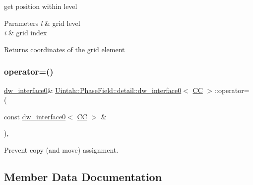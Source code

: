 get position within level 


\begin{DoxyParams}{Parameters}
{\em l} & grid level \\
\hline
{\em i} & grid index \\
\hline
\end{DoxyParams}
\begin{DoxyReturn}{Returns}
coordinates of the grid element 
\end{DoxyReturn}
\mbox{\label{classUintah_1_1PhaseField_1_1detail_1_1dw__interface0_3_01CC_01_4_a4e44be489fb9c660a8584c95b4e104b8}} 
\subsubsection{\texorpdfstring{operator=()}{operator=()}}
{\footnotesize\ttfamily \hyperlink{classUintah_1_1PhaseField_1_1detail_1_1dw__interface0}{dw\+\_\+interface0}\& \hyperlink{classUintah_1_1PhaseField_1_1detail_1_1dw__interface0}{Uintah\+::\+Phase\+Field\+::detail\+::dw\+\_\+interface0}$<$ \hyperlink{namespaceUintah_1_1PhaseField_a33d355affda78a83f45755ba8388cedda22303704507d024d1d6508ed9859a85a}{CC} $>$\+::operator= (\begin{DoxyParamCaption}\item[{const \hyperlink{classUintah_1_1PhaseField_1_1detail_1_1dw__interface0}{dw\+\_\+interface0}$<$ \hyperlink{namespaceUintah_1_1PhaseField_a33d355affda78a83f45755ba8388cedda22303704507d024d1d6508ed9859a85a}{CC} $>$ \&}]{ }\end{DoxyParamCaption})\hspace{0.3cm}{\ttfamily [protected]}, {\ttfamily [delete]}}



Prevent copy (and move) assignment. 



\subsection{Member Data Documentation}
\mbox{\label{classUintah_1_1PhaseField_1_1detail_1_1dw__interface0_3_01CC_01_4_a95c8e4cca1a77793692a758d06dac8a5}} 
